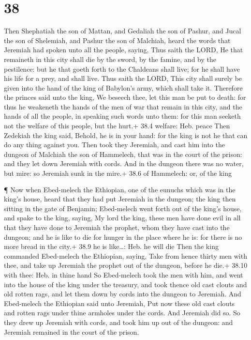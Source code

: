 \hypertarget{section-37}{%
\section{38}\label{section-37}}

 Then Shephatiah the son of Mattan, and Gedaliah the son of
Pashur, and Jucal the son of Shelemiah, and Pashur the son of Malchiah,
heard the words that Jeremiah had spoken unto all the people, saying,
 Thus saith the LORD, He that remaineth in this city shall
die by the sword, by the famine, and by the pestilence: but he that
goeth forth to the Chaldeans shall live; for he shall have his life for
a prey, and shall live.  Thus saith the LORD, This city
shall surely be given into the hand of the king of Babylon's army, which
shall take it.  Therefore the princes said unto the king, We
beseech thee, let this man be put to death: for thus he weakeneth the
hands of the men of war that remain in this city, and the hands of all
the people, in speaking such words unto them: for this man seeketh not
the welfare of this people, but the hurt.+ 38.4 welfare: Heb. peace
 Then Zedekiah the king said, Behold, he is in your hand:
for the king is not he that can do any thing against you. 
Then took they Jeremiah, and cast him into the dungeon of Malchiah the
son of Hammelech, that was in the court of the prison: and they let down
Jeremiah with cords. And in the dungeon there was no water, but mire: so
Jeremiah sunk in the mire.+ 38.6 of Hammelech: or, of the king

 ¶ Now when Ebed-melech the Ethiopian, one of the eunuchs
which was in the king's house, heard that they had put Jeremiah in the
dungeon; the king then sitting in the gate of Benjamin; 
Ebed-melech went forth out of the king's house, and spake to the king,
saying,  My lord the king, these men have done evil in all
that they have done to Jeremiah the prophet, whom they have cast into
the dungeon; and he is like to die for hunger in the place where he is:
for there is no more bread in the city.+ 38.9 he is like\ldots: Heb. he
will die  Then the king commanded Ebed-melech the
Ethiopian, saying, Take from hence thirty men with thee, and take up
Jeremiah the prophet out of the dungeon, before he die.+ 38.10 with
thee: Heb. in thine hand  So Ebed-melech took the men with
him, and went into the house of the king under the treasury, and took
thence old cast clouts and old rotten rags, and let them down by cords
into the dungeon to Jeremiah.  And Ebed-melech the
Ethiopian said unto Jeremiah, Put now these old cast clouts and rotten
rags under thine armholes under the cords. And Jeremiah did so.
 So they drew up Jeremiah with cords, and took him up out
of the dungeon: and Jeremiah remained in the court of the prison.

